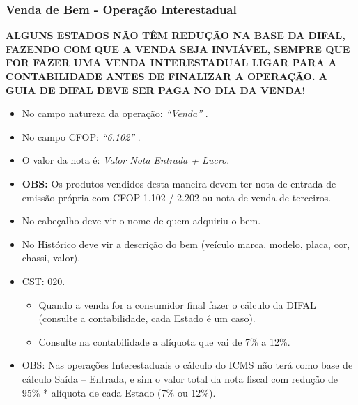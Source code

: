 \documentclass{article}
\newcommand{\itasp}[1]{
  \textit{``#1''}
}
\begin{document}
\subsubsection{Venda de Bem - Operação Interestadual}
\label{emissaonfe:saida-venda-externa}
\begin{tcolorbox}[title=Atenção!]
  \textbf{ALGUNS ESTADOS NÃO TÊM REDUÇÃO NA BASE DA DIFAL, FAZENDO COM QUE A VENDA SEJA INVIÁVEL, SEMPRE QUE FOR FAZER UMA VENDA INTERESTADUAL LIGAR PARA A CONTABILIDADE ANTES DE FINALIZAR A OPERAÇÃO. A GUIA DE DIFAL DEVE SER PAGA NO DIA DA VENDA!}
\end{tcolorbox}
\begin{itemize}
  \item No campo natureza da operação: \itasp{Venda}.
  \item No campo CFOP: \itasp{6.102}.
  \item O valor da nota é: \textit{Valor Nota Entrada + Lucro}.
  \item \textbf{OBS:} Os produtos vendidos desta maneira devem ter nota de entrada de emissão própria com CFOP 1.102 / 2.202 ou nota de venda de terceiros.
  \item No cabeçalho deve vir o nome de quem adquiriu o bem.
  \item No Histórico deve vir a descrição do bem (veículo marca, modelo, placa, cor, chassi, valor).
  \item CST: 020.
  \begin{tcolorbox}[title=Cálculo do ICMS (Operação Interestadual)]
    \begin{itemize}
      \item Quando a venda for a consumidor final fazer o cálculo da DIFAL (consulte a contabilidade, cada Estado é um caso).
      \item Consulte na contabilidade a alíquota que vai de 7\% a 12\%.
    \end{itemize}
  \end{tcolorbox}
  \item OBS: Nas operações Interestaduais o cálculo do ICMS não terá como base de cálculo Saída – Entrada, e sim o valor total da nota fiscal com redução de 95\% * alíquota de cada Estado (7\% ou 12\%).
\end{itemize}
\end{document}
